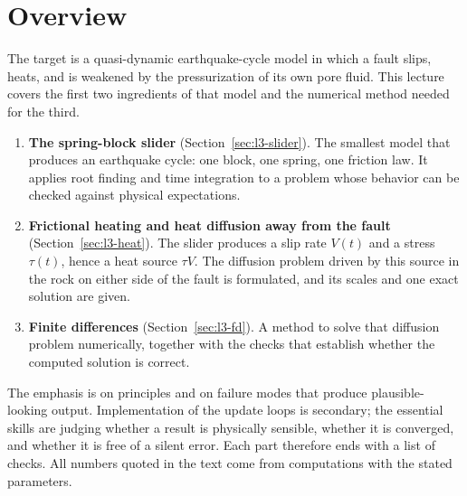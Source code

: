 
\section{Overview}
\label{sec:l3-overview}

The target is a quasi-dynamic earthquake-cycle model in which a fault slips, heats, and is weakened by the pressurization of its own pore fluid. This lecture covers the first two ingredients of that model and the numerical method needed for the third.

\begin{enumerate}[itemsep=1pt,topsep=2pt]
\item \textbf{The spring-block slider} (Section~\ref{sec:l3-slider}). The smallest model that produces an earthquake cycle: one block, one spring, one friction law. It applies root finding and time integration to a problem whose behavior can be checked against physical expectations.
\item \textbf{Frictional heating and heat diffusion away from the fault} (Section~\ref{sec:l3-heat}). The slider produces a slip rate $V(t)$ and a stress $\tau(t)$, hence a heat source $\tau V$. The diffusion problem driven by this source in the rock on either side of the fault is formulated, and its scales and one exact solution are given.
\item \textbf{Finite differences} (Section~\ref{sec:l3-fd}). A method to solve that diffusion problem numerically, together with the checks that establish whether the computed solution is correct.
\end{enumerate}

The emphasis is on principles and on failure modes that produce plausible-looking output. Implementation of the update loops is secondary; the essential skills are judging whether a result is physically sensible, whether it is converged, and whether it is free of a silent error. Each part therefore ends with a list of checks. All numbers quoted in the text come from computations with the stated parameters.

